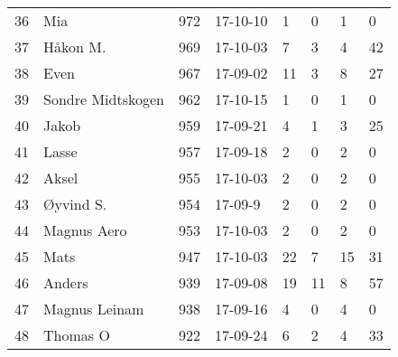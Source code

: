 \begin{longtable}{|r|l|r|l|l|l|l|l|}
36 &                  Mia &   972 &    17-10-10 &               1 &     0 &       1 &         0 \\
37 &             Håkon M. &   969 &    17-10-03 &               7 &     3 &       4 &        42 \\
38 &                 Even &   967 &    17-09-02 &              11 &     3 &       8 &        27 \\
39 &    Sondre Midtskogen &   962 &    17-10-15 &               1 &     0 &       1 &         0 \\
40 &                Jakob &   959 &    17-09-21 &               4 &     1 &       3 &        25 \\
41 &                Lasse &   957 &    17-09-18 &               2 &     0 &       2 &         0 \\
42 &                Aksel &   955 &    17-10-03 &               2 &     0 &       2 &         0 \\
43 &            Øyvind S. &   954 &     17-09-9 &               2 &     0 &       2 &         0 \\
44 &          Magnus Aero &   953 &    17-10-03 &               2 &     0 &       2 &         0 \\
45 &                 Mats &   947 &    17-10-03 &              22 &     7 &      15 &        31 \\
46 &               Anders &   939 &    17-09-08 &              19 &    11 &       8 &        57 \\
47 &        Magnus Leinam &   938 &    17-09-16 &               4 &     0 &       4 &         0 \\
48 &             Thomas O &   922 &    17-09-24 &               6 &     2 &       4 &        33 \\
\end{longtable}

